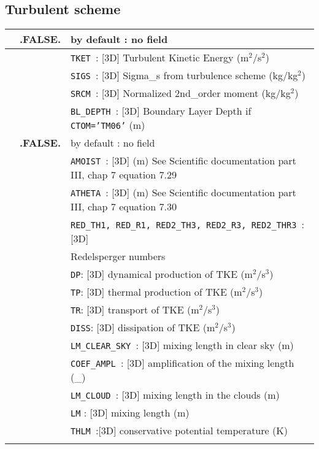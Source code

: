 \subsection{Turbulent scheme}
\begin{center}
\begin{tabular}{|>{\centering}p{3cm}|>{\centering}p{2.5cm}|p{11cm}|}
 \hline
\multirow{4}{*}{LVAR\_TURB}\index{LVAR\_TURB!\innam{NAM\_DIAG}}&\textbf{.FALSE.} & by default : no field \\\cline{2-3}
&\multirow{2}{*}{.TRUE.} & {\tt TKET }: [3D] Turbulent Kinetic Energy (m$^2$/s$^2$)\\\cline{3-3}
& &  {\tt SIGS }: [3D] Sigma\_s from turbulence scheme (kg/kg$^2$) \\\cline{3-3}
& & {\tt SRCM }: [3D] Normalized 2nd\_order moment (kg/kg$^2$)\\\cline{3-3}
& &{\tt BL\_DEPTH }: [3D] Boundary Layer Depth if {\tt CTOM='TM06'} (m) \\ \hline 
\hline 
\multirow{21}{*}{LTURBDIAG}\index{LTURBDIAG!\innam{NAM\_DIAG}}&\textbf{.FALSE.} & by default : no field \\\cline{2-3}
 &\multirow{21}{*}{.TRUE.} & {\tt AMOIST }: [3D] (m) See Scientific documentation part III, chap 7 equation 7.29\\\cline{3-3}
& & {\tt ATHETA }: [3D] (m)  See Scientific documentation part III, chap 7 equation 7.30\\\cline{3-3}
& &{\tt RED\_TH1, RED\_R1, RED2\_TH3, RED2\_R3, RED2\_THR3 }: [3D] \\
& & Redelsperger numbers \\\cline{3-3}
& &{\tt DP}: [3D] dynamical production of TKE (m$^2$/s$^3$) \\\cline{3-3}
& &{\tt TP}: [3D] thermal production of TKE (m$^2$/s$^3$) \\\cline{3-3}
& &{\tt  TR}: [3D]  transport of TKE (m$^2$/s$^3$) \\\cline{3-3}
& &{\tt  DISS}: [3D] dissipation of TKE (m$^2$/s$^3$)\\\cline{3-3}
& &{\tt  LM\_CLEAR\_SKY }: [3D]  mixing length in clear sky (m) \\\cline{3-3}
& &{\tt COEF\_AMPL }: [3D] amplification of the mixing length (\_) \\\cline{3-3}
& &{\tt LM\_CLOUD }: [3D]  mixing length in the clouds (m) \\\cline{3-3}
& & {\tt LM} : [3D] mixing length (m)\\\cline{3-3}
& & {\tt THLM }:[3D] conservative potential temperature (K)\\\cline{3-3}

\end{tabular}
\end{center}

